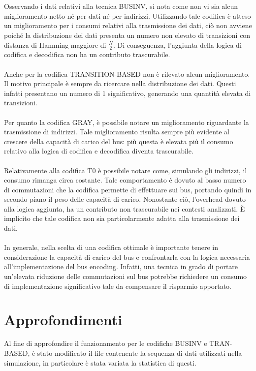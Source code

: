 \documentclass[11pt,  english, makeidx, a4paper, titlepage, oneside]{book}
\begin{document}
\\\\
Osservando i dati relativi alla tecnica BUSINV, si nota come non vi sia alcun miglioramento netto né per dati né per indirizzi. Utilizzando tale codifica è atteso un miglioramento per i consumi relativi alla trasmissione dei dati, ciò non avviene poiché la distribuzione dei dati presenta un numero non elevato di transizioni con distanza di Hamming maggiore di $\frac{N}{2}$. Di conseguenza, l'aggiunta della logica di codifica e decodifica non ha un contributo trascurabile.
\\\\
Anche per la codifica TRANSITION-BASED non è rilevato alcun miglioramento. Il motivo principale è sempre da ricercare nella distribuzione dei dati. Questi infatti presentano un numero di 1 significativo, generando una quantità elevata di transizioni.
\\\\
Per quanto la codifica GRAY, è possibile notare un miglioramento riguardante la trasmissione di indirizzi. Tale miglioramento risulta sempre più evidente al crescere della capacità di carico del bus: più questa è elevata più il consumo relativo alla logica di codifica e decodifica diventa trascurabile.
\\\\
Relativamente alla codifica T0 è possibile notare come, simulando gli indirizzi, il consumo rimanga circa costante. Tale comportamento è dovuto al basso numero di commutazioni che la codifica permette di effettuare sui bus, portando quindi in secondo piano il peso delle capacità di carico. Nonostante ciò, l'overhead dovuto alla logica aggiunta, ha un contributo non trascurabile nei contesti analizzati. È implicito che tale codifica non sia particolarmente adatta alla trasmissione dei dati.
\\\\
In generale, nella scelta di una codifica ottimale è importante tenere in considerazione la capacità di carico del bus e confrontarla con la logica necessaria all'implementazione del bus encoding. Infatti, una tecnica in grado di portare un'elevata riduzione delle commutazioni sul bus potrebbe richiedere un consumo di implementazione significativo tale da compensare il risparmio apportato.
\newpage
\section{Approfondimenti}
Al fine di approfondire il funzionamento per le codifiche BUSINV e TRAN-BASED, è stato modificato il file contenente la sequenza di dati utilizzati nella simulazione, in particolare è stata variata la statistica di questi.
\end{document}
